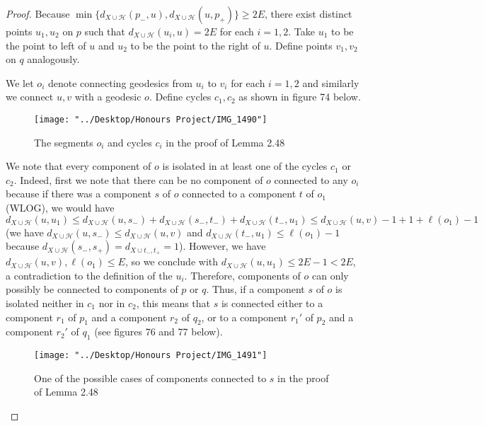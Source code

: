 \documentclass[12pt]{article}
\newcommand{\vs}{\vskip10pt}
\begin{document}
	
	\begin{proof}
		
		Because $\min \{d_{X \cup \mathcal{H}}(p_{-}, u), d_{X \cup \mathcal{H}}(u, p_{+})\} \geq 2 E$, there exist distinct points $u_1, u_2$ on $p$ such that $d_{X \cup \mathcal{H}}(u_i, u) = 2 E$ for each $i = 1,2$. Take $u_1$ to be the point to left of $u$ and $u_2$ to be the point to the right of $u$. Define points $v_1, v_2$ on $q$ analogously. 
		
		\vs 
		
		We let $o_i$ denote connecting geodesics from $u_i$ to $v_i$ for each $i = 1,2$ and similarly we connect $u,v$ with a geodesic $o$. Define cycles $c_1, c_2$ as shown in figure 74 below. 
		
\begin{figure} [H]
	\centering
	\texttt{[image: "../Desktop/Honours Project/IMG\_1490"]}
	\caption{The segments $o_i$ and cycles $c_i$ in the proof of Lemma 2.48}
	\label{fig:img1490}
\end{figure}
		
		We note that every component of $o$ is isolated in at least one of the cycles $c_1$ or $c_2$. Indeed, first we note that there can be no component of $o$ connected to any $o_i$ because if there was a component $s$ of $o$ connected to a component $t$ of $o_1$ (WLOG), we would have $d_{X \cup \mathcal{H}}(u,u_1) \leq d_{X \cup \mathcal{H}}(u, s_{-}) + d_{X \cup \mathcal{H}} (s_{-}, t_{-}) + d_{X \cup \mathcal{H}} (t_{-}, u_1) \leq d_{X \cup \mathcal{H}} (u,v) - 1 + 1 + \ell(o_1) - 1$ (we have $d_{X \cup \mathcal{H}} (u, s_{-}) \leq d_{X \cup \mathcal{H}} (u,v)$ and $d_{X \cup \mathcal{H}} (t_{-}, u_1) \leq \ell(o_1) - 1$ because $d_{X \cup \mathcal{H}} (s_{-}, s_{+}) = d_{X \cup t_{-}, t_{+}} = 1$). However, we have $d_{X \cup \mathcal{H}}(u,v), \ell(o_1) \leq E$, so we conclude with $d_{X \cup \mathcal{H}} (u,u_1) \leq 2E -1 < 2E$, a contradiction to the definition of the $u_i$. Therefore, components of $o$ can only possibly be connected to components of $p$ or $q$. Thus, if a component $s$ of $o$ is isolated neither in $c_1$ nor in $c_2$, this means that $s$ is connected either to a component $r_1$ of $p_1$ and a component $r_2$ of $q_2$, or to a component $r_1'$ of $p_2$ and a component $r_2'$ of $q_1$ (see figures 76 and 77 below).
		
		
\begin{figure} [H]
	\centering
	\texttt{[image: "../Desktop/Honours Project/IMG\_1491"]}
	\caption{One of the possible cases of components connected to $s$ in the proof of Lemma 2.48}
	\label{fig:img1491}
\end{figure}


\end{proof}
\end{document}
